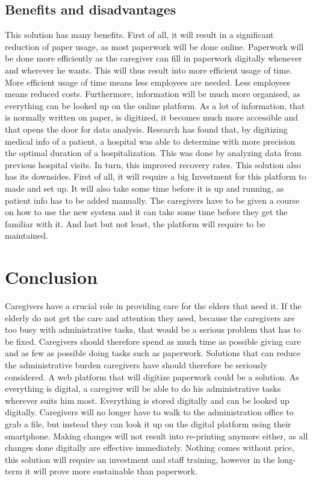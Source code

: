 \documentclass[a4paper, 11pt]{article}
\begin{document}
\begin{center}
\subsection{Benefits and disadvantages}
This solution has many benefits. First of all, it will result in a significant
reduction of paper usage, as most paperwork will be done online. Paperwork
will be done more efficiently as the caregiver can fill in paperwork digitally
whenever and wherever he wants. This will thus result into more efficient usage
of time. More efficient usage of time means less employees are needed. Less
employees means reduced costs.
Furthermore, information will be much more organised, as everything can be
looked up on the online platform.
As a lot of information, that is normally written on paper, is digitized, it
becomes much more accessible and that opens the door for data analysis.
Research has found that, by digitizing medical info of a patient, a hospital was
able to determine with more precision the optimal duration of a hospitalization.
This was done by analyzing data from previous hospital visits. In turn, this
improved recovery rates. \cite{chaudhry2006systematic}
This solution also has its downsides. First of all, it will require a big Investment
for this platform to made and set up. It will also take some time before it is up
and running, as patient info has to be added manually. The caregivers have to
be given a course on how to use the new system and it can take some time
before they get the familiar with it. And last but not least, the platform will
require to be maintained.

\section{Conclusion}
Caregivers have a crucial role in providing care for the elders that need it. If
the elderly do not get the care and attention they need, because the caregivers
are too busy with administrative tasks, that would be a serious problem that
has to be fixed. Caregivers should therefore spend as much time as possible
giving care and as few as possible doing tasks such as paperwork. Solutions
that can reduce the administrative burden caregivers have should therefore be
seriously considered.
A web platform that will digitize paperwork could be a solution. As everything is
digital, a caregiver will be able to do his administrative tasks wherever suits
him most. Everything is stored digitally and can be looked up digitally.
Caregivers will no longer have to walk to the administration office to grab a file,
but instead they can look it up on the digital platform using their smartphone.
Making changes will not result into re-printing anymore either, as all changes
done digitally are effective immediately.
Nothing comes without price, this solution will require an investment and staff
training, however in the long-term it will prove more sustainable than
paperwork.


\clearpage
\vspace*{1mm}


\printindex{}

\end{center}
\end{document}
